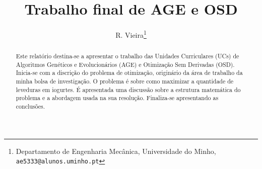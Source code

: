 \documentclass[a4paper,12pt]{article}
\begin{document}
%
\title{Trabalho final de AGE e OSD}


\author{R. Vieira\thanks{Departamento de Engenharia Mecânica, Universidade do Minho, {\tt ae5333@alunos.uminho.pt}}}

\maketitle              %

\begin{abstract}

Este relatório destina-se a apresentar o trabalho das Unidades Curriculares (UCs) de Algoritmos Genéticos e Evolucionários (AGE) e Otimização Sem Derivadas (OSD). Inicia-se com a discrição do problema de otimização, originário da área de trabalho da minha bolsa de investigação. O problema é sobre como maximizar a quantidade de leveduras em iogurtes. É apresentada uma discussão sobre a estrutura matemática do problema e a abordagem usada na sua resolução. Finaliza-se apresentando as conclusões.
\end{abstract}
\end{document}
